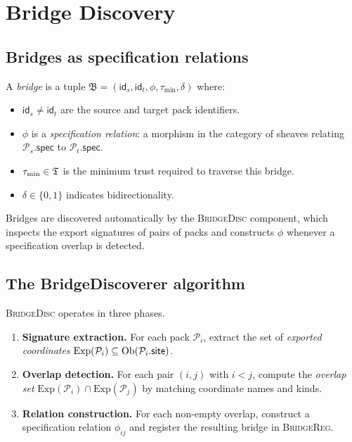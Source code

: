 \documentclass[11pt]{article}
\newcommand{\Pack}{\mathcal{P}}
\newcommand{\Brid}{\mathfrak{B}}
\newcommand{\PackId}{\mathsf{id}}
\newcommand{\PackSite}{\mathsf{site}}
\newcommand{\PackSpec}{\mathsf{spec}}
\newcommand{\BR}{\textsc{BridgeReg}}
\newcommand{\BD}{\textsc{BridgeDisc}}
\begin{document}
\section{Bridge Discovery}
\label{sec:discovery}

\subsection{Bridges as specification relations}

\begin{definition}[Bridge]
\label{def:bridge}
A \emph{bridge} is a tuple
$\Brid = (\PackId_s, \PackId_t, \phi, \tau_{\min}, \delta)$
where:
\begin{itemize}
  \item $\PackId_s \neq \PackId_t$ are the source and target pack
    identifiers.
  \item $\phi$ is a \emph{specification relation}: a morphism in the
    category of sheaves relating $\Pack_s.\PackSpec$ to
    $\Pack_t.\PackSpec$.
  \item $\tau_{\min} \in \mathfrak{T}$ is the minimum trust required to
    traverse this bridge.
  \item $\delta \in \{0,1\}$ indicates bidirectionality.
\end{itemize}
\end{definition}

Bridges are discovered automatically by the \BD{} component, which
inspects the export signatures of pairs of packs and constructs
$\phi$ whenever a specification overlap is detected.

\subsection{The BridgeDiscoverer algorithm}

\BD{} operates in three phases.
\begin{enumerate}[label=\textbf{Phase \arabic*.}]
  \item \textbf{Signature extraction.}  For each pack $\Pack_i$, extract
    the set of \emph{exported coordinates}
    $\mathrm{Exp}(\Pack_i) \subseteq \Ob(\Pack_i.\PackSite)$.
  \item \textbf{Overlap detection.}  For each pair $(i, j)$ with
    $i < j$, compute the \emph{overlap set}
    $\mathrm{Exp}(\Pack_i) \cap \mathrm{Exp}(\Pack_j)$
    by matching coordinate names and kinds.
  \item \textbf{Relation construction.}  For each non-empty overlap,
    construct a specification relation $\phi_{ij}$ and register the
    resulting bridge in \BR{}.
\end{enumerate}
\end{document}
